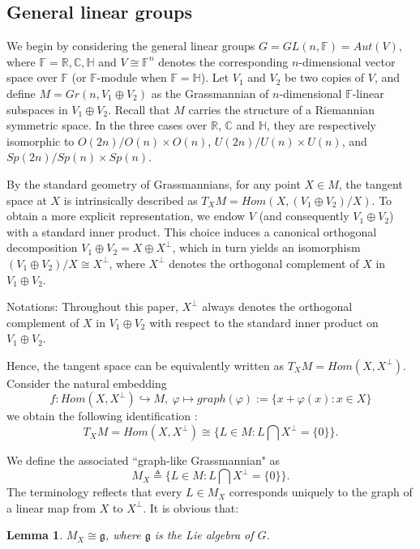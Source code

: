 \documentclass{article}
\newtheorem{lem}{Lemma}[section]
\begin{document}
\subsection{General linear groups}
We begin by considering the general linear groups $G=GL(n,\mathbb{F})=Aut(V)$, where $\mathbb{F}=\mathbb{R},\mathbb{C},\mathbb{H}$ and $V \cong \mathbb{F}^n$ denotes the corresponding
$n$-dimensional vector space over $\mathbb{F}$ (or $\mathbb{F}$-module when $\mathbb{F}=\mathbb{H}$). Let $V_1$ and $V_2$  be two copies of $V$, and define $M=Gr(n, V_1\oplus V_2)$ as the
Grassmannian of $n$-dimensional $\mathbb{F}$-linear subspaces in $V_1 \oplus V_2$. Recall that
$M$ carries the structure of a Riemannian symmetric space. In the three cases over $\mathbb{R}$, $\mathbb{C}$ and $\mathbb{H}$, they are respectively isomorphic to $O(2n)/O(n) \times O(n)$, $U(2n)/U(n) \times U(n)$, and $Sp(2n)/Sp(n) \times Sp(n)$.

By the standard geometry of Grassmannians, for any point $X \in M$, the tangent space at $X$  is intrinsically described as $T_{X}M=Hom(X, (V_1 \oplus V_2)/X)$.
To obtain a more explicit representation, we endow $V$ (and consequently $V_1 \oplus V_2$) with a standard inner product. This choice induces a canonical orthogonal decomposition
$V_1 \oplus V_2=X \oplus X^{\perp}$, which in turn yields an isomorphism $(V_1 \oplus V_2)/X \cong X^\perp$, where
$X^{\perp}$ denotes the orthogonal complement of $X$ in $V_1\oplus V_2$.

\bigskip
Notations: Throughout this paper, $X^{\perp}$ always denotes the orthogonal complement of $X$ in $V_1\oplus V_2$ with respect to the standard inner product on $V_1\oplus V_2$.

\bigskip
Hence, the tangent space can be equivalently written as $T_{X}M=Hom(X, X^{\perp})$. Consider the natural embedding
\[
f: Hom(X,X^\perp) \hookrightarrow M, ~  \varphi \mapsto
graph(\varphi):=\{x + \varphi(x): x \in X\}
\]
we obtain the following identification \cite{C}:
\[
T_{X}M=Hom(X, X^{\perp}) \cong \{L \in
M: L \bigcap X^\perp=\{0\}\}.
\]


We define the associated ``graph-like Grassmannian" as
\[
M_{X} \triangleq \{L \in
M: L \bigcap X^{\perp}=\{0\}\}.
\]
The terminology reflects that every $ L \in M_X $ corresponds uniquely to the graph of a linear map from $ X $ to $ X^{\perp} $.
It is obvious that:
\begin{lem}
$M_{X} \cong \mathfrak{g}$, where $\mathfrak{g}$ is the Lie algebra of $G$.
\end{lem}
\end{document}
